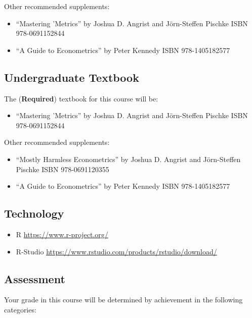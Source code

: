 \documentclass[]{tufte-handout}
\begin{document}
\noindent Other recommended supplements:

\begin{itemize}

    \item ``Mastering 'Metrics'' by Joshua D. Angrist and J{\"o}rn-Steffen Pischke
    ISBN 978-0691152844
    \item ``A Guide to Econometrics'' by Peter Kennedy ISBN  978-1405182577
\end{itemize}

\subsection*{Undergraduate Textbook}

The (\textbf{Required}) textbook for this course will be:

\begin{itemize}
    \item ``Mastering 'Metrics'' by Joshua D. Angrist and J{\"o}rn-Steffen Pischke
    ISBN 978-0691152844
\end{itemize}

\noindent Other recommended supplements:

\begin{itemize}

    \item ``Mostly Harmless Econometrics'' by Joshua D. Angrist and J{\"o}rn-Steffen Pischke
    ISBN 978-0691120355
    \item ``A Guide to Econometrics'' by Peter Kennedy ISBN  978-1405182577
\end{itemize}

\subsection*{Technology}
\begin{itemize}
    \item R \url{https://www.r-project.org/}
    \item R-Studio \url{https://www.rstudio.com/products/rstudio/download/}
\end{itemize}

\subsection*{Assessment}

Your grade in this course will be determined by achievement in the
following categories:
\end{document}
